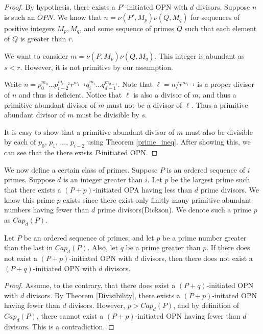 \documentclass[../paper.tex]{subfiles}
\begin{document}
\begin{proof}
By hypothesis, there exists a $P'$-initiated OPN with $d$ divisors.
Suppose $n$ is such an $OPN$. We know that $n = \nu(P', M_p) 
\nu(Q, M_q)$ for sequences of positive integers $M_p, M_q$, and 
some sequence of primes $Q$ such that each element of $Q$ is 
greater than $r$.

  We want to consider $m = \nu(P, M_p) \nu(Q, M_q)$. This integer is
abundant as $s < r$. However, it is not primitive by our
assumption.

  Write $n = p_0^{m_0} ... p_{i-2}^{m_{i-2}} r^{m_{i-1}}
q_{i}^{m_i} ... q_{d-1}^{m_{d-1}}$. Note that $\ell = n / r^{m_{i-1}}$ is
a proper divisor of $n$ and thus is deficient. Notice that $\ell$
is also a divisor of $m$, and thus a primitive abundant divisor of
$m$ must not be a divisor of $\ell$. Thus a primitive abundant
divisor of $m$ must be divisible by $s$.

  It is easy to show that a primitive abundant divisor of $m$ must
also be divisible by each of $p_0$, $p_1$, ..., $p_{i-2}$ using Theorem
{\ref{prime_ineq}}. After showing this, we can see that the 
there exists $P$-initiated OPN.
\end{proof}


We now define a certain class of primes.
Suppose $P$ is an ordered sequence of $i$ primes. Suppose $d$ is
an integer greater than $i$. Let $p$ be the largest prime such 
that there exists a $(P + p)$-initiated OPA having less than $d$ 
prime divisors\footnotemark. 
We know this prime $p$ exists since 
there exist only finitly many primitive abundant numbers having
fewer than $d$ prime divisors(Dickson). We denote such a prime $p$
as $Cap_d(P)$. 

\begin{theorem}
Let $P$ be an ordered sequence of primes, and let $p$ be a prime
number greater than the last in $Cap_d(P)$. Also, let $q$ be a prime
greater than $p$. If there does not exist a $(P + p)$-initiated
OPN with $d$ divisors, then there does not exist a $(P +
q)$-initiated OPN with $d$ divisors.
\end{theorem}

\begin{proof}
Assume, to the contrary, that there does exist a $(P + 
q)$-initiated OPN with $d$ divisors. By Theorem {\ref{Divisibility}},
there exists a $(P + p)$-initated OPN having fewer than $d$
divisors. However, $p > Cap_d(P)$, and by definition of
$Cap_d(P)$, there cannot exist a $(P + p)$-initiated OPN having
fewer than $d$ divisors. This is a contradiction.
\end{proof}
\end{document}
